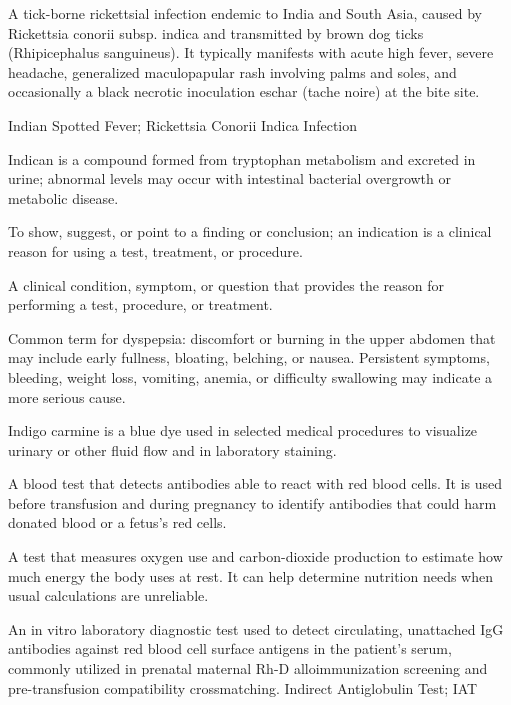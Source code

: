  A tick-borne rickettsial infection endemic to India and South Asia, caused by Rickettsia conorii subsp. indica and transmitted by brown dog ticks (Rhipicephalus sanguineus). It typically manifests with acute high fever, severe headache, generalized maculopapular rash involving palms and soles, and occasionally a black necrotic inoculation eschar (tache noire) at the bite site.

\synonyms
Indian Spotted Fever; Rickettsia Conorii Indica Infection

 Indican is a compound formed from tryptophan metabolism and excreted in urine; abnormal levels may occur with intestinal bacterial overgrowth or metabolic disease.

 To show, suggest, or point to a finding or conclusion; an indication is a clinical reason for using a test, treatment, or procedure.

 A clinical condition, symptom, or question that provides the reason for performing a test, procedure, or treatment.

 Common term for dyspepsia: discomfort or burning in the upper abdomen that may include early fullness, bloating, belching, or nausea. Persistent symptoms, bleeding, weight loss, vomiting, anemia, or difficulty swallowing may indicate a more serious cause.

 Indigo carmine is a blue dye used in selected medical procedures to visualize urinary or other fluid flow and in laboratory staining.

 A blood test that detects antibodies able to react with red blood cells. It is used before transfusion and during pregnancy to identify antibodies that could harm donated blood or a fetus’s red cells.

 A test that measures oxygen use and carbon-dioxide production to estimate how much energy the body uses at rest. It can help determine nutrition needs when usual calculations are unreliable.

 An in vitro laboratory diagnostic test used to detect circulating, unattached IgG antibodies against red blood cell surface antigens in the patient's serum, commonly utilized in prenatal maternal Rh-D alloimmunization screening and pre-transfusion compatibility crossmatching.
\synonyms
Indirect Antiglobulin Test; IAT

